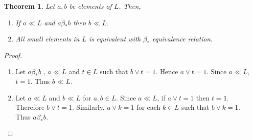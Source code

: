 \documentclass[a4paper,12pt]{article}
\newtheorem{theorem}{Theorem}[section]
\numberwithin{equation}{section}
\begin{document}
\begin{theorem} \label{4}
  Let $ a,b $ be elements of $ L $. Then,
  \begin{enumerate}[label=(\roman{*}), ref=(\roman{*})]

    \item
      If $ a \ll L $ and $ a \beta_* b $ then $ b \ll L $.
    \item \label{4.2}
      All small elements in $ L $ is equivalent with $ \beta_* $ equivalence relation.
  \end{enumerate}
\end{theorem}

\begin{proof}
  \begin{enumerate}
    \item
      Let $ a \beta_* b $ , $ a \ll L $ and $ t \in L $ such that $ b \vee t = 1 $. 
      Hence $ a \vee t = 1 $. Since $ a \ll L $, $ t = 1 $. Thus $ b \ll L $. 
    \item
      Let $ a \ll L $ and $ b \ll L $ for $ a,b \in L $. Since $ a \ll L $, if $ a \vee t = 1 $ 
      then $ t = 1 $. Therefore $ b \vee t = 1 $. 
      Similarly, $ a \vee k = 1 $ for each $ k \in L $ such that $ b \vee k = 1 $. 
      Thus $ a \beta_* b $. 
  \end{enumerate}
\end{proof}
\end{document}

